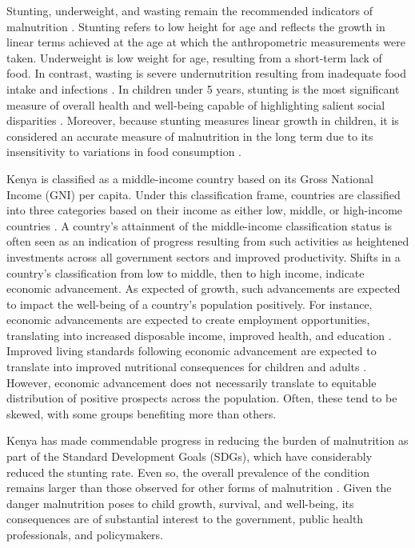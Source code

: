 \documentclass[sn-basic,Numbered,pdflatex]{sn-jnl}
\theoremstyle{remark}
\theoremstyle{definition}
\begin{document}
Stunting, underweight, and wasting remain the recommended indicators of
malnutrition \citep{jonah2018}. Stunting refers to low height for age
and reflects the growth in linear terms achieved at the age at which the
anthropometric measurements were taken. Underweight is low weight for
age, resulting from a short-term lack of food. In contrast, wasting is
severe undernutrition resulting from inadequate food intake and
infections \citep{jonah2018}. In children under 5 years, stunting is the
most significant measure of overall health and well-being capable of
highlighting salient social disparities \citep{deOnis2016}. Moreover,
because stunting measures linear growth in children, it is considered an
accurate measure of malnutrition in the long term due to its
insensitivity to variations in food consumption
\citep{Hoddinott2013, Zere2003}.

Kenya is classified as a middle-income country based on its Gross
National Income (GNI) per capita. Under this classification frame,
countries are classified into three categories based on their income as
either low, middle, or high-income countries \citep{jonah2018}. A
country's attainment of the middle-income classification status is often
seen as an indication of progress resulting from such activities as
heightened investments across all government sectors and improved
productivity. Shifts in a country's classification from low to middle,
then to high income, indicate economic advancement. As expected of
growth, such advancements are expected to impact the well-being of a
country's population positively. For instance, economic advancements are
expected to create employment opportunities, translating into increased
disposable income, improved health, and education
\citep{Bloom2004, Ranis2000}. Improved living standards following
economic advancement are expected to translate into improved nutritional
consequences for children and adults \citep{Marmot2002, Ettner1996}.
However, economic advancement does not necessarily translate to
equitable distribution of positive prospects across the population.
Often, these tend to be skewed, with some groups benefiting more than
others.

Kenya has made commendable progress in reducing the burden of
malnutrition as part of the Standard Development Goals (SDGs), which
have considerably reduced the stunting rate. Even so, the overall
prevalence of the condition remains larger than those observed for other
forms of malnutrition \citep{jonah2018, Haddad2015}. Given the danger
malnutrition poses to child growth, survival, and well-being, its
consequences are of substantial interest to the government, public
health professionals, and policymakers.
\end{document}

